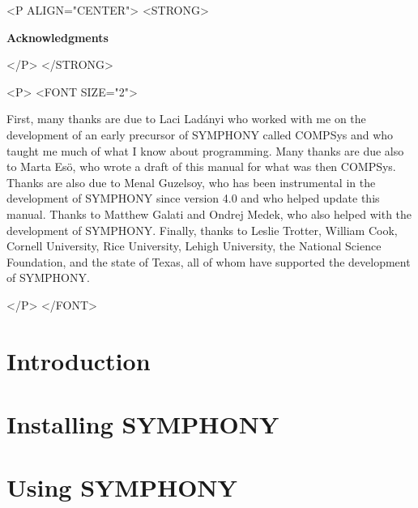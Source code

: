 \documentclass[twoside,11pt]{book}
\begin{document}
\newpage

\thispagestyle{empty}

\vspace*{1in}
\begin{rawhtml} <P ALIGN="CENTER"> <STRONG> 
\end{rawhtml}
\begin{center}
\textbf{\large Acknowledgments}
\end{center}
\begin{rawhtml} </P> </STRONG> 
\end{rawhtml}
\begin{rawhtml} <P> <FONT SIZE="2"> 
\end{rawhtml}
First, many thanks are due to Laci Lad\'anyi who worked with me on the
development of an early precursor of SYMPHONY called COMPSys and who taught me
much of what I know about programming. Many thanks are due also to Marta
Es\"o, who wrote a draft of this manual for what was then COMPSys. Thanks are
also due to Menal Guzelsoy, who has been instrumental in the development of
SYMPHONY since version 4.0 and who helped update this manual. Thanks to
Matthew Galati and Ondrej Medek, who also helped with the development of
SYMPHONY. Finally, thanks to Leslie Trotter, William Cook, Cornell University,
Rice University, Lehigh University, the National Science Foundation, and the
state of Texas, all of whom have supported the development of SYMPHONY.
\begin{rawhtml} </P> </FONT> 
\end{rawhtml}

\newpage

\thispagestyle{empty}

\newpage

\tableofcontents

\newpage

\mainmatter


\chapter{Introduction}


\chapter{Installing SYMPHONY}
\label{getting_started}


\chapter{Using SYMPHONY}
\label{API-overview}

\end{document}

